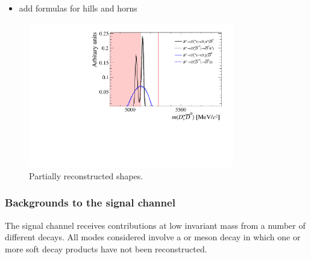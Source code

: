 {\color{Red}
\begin{itemize}
\item add formulas for hills and horns
\end{itemize}
}



\begin{figure}[!h]
    \centering
    \includegraphics[width=0.80\textwidth]{figs/B2DsKK/B2DsKK_DsD0_part_reco_Shapes.pdf}
    \caption{Partially reconstructed \Dsp\Dzb shapes.}
    \label{fig:B2DsPhi_DsD0_partreco}   
\end{figure}





\subsubsection{Backgrounds to the signal channel}

The signal channel receives contributions at low invariant mass from a number of different decays. 
All modes considered involve a \Bs or \Bz meson decay in which one or more soft decay products have not been reconstructed.

